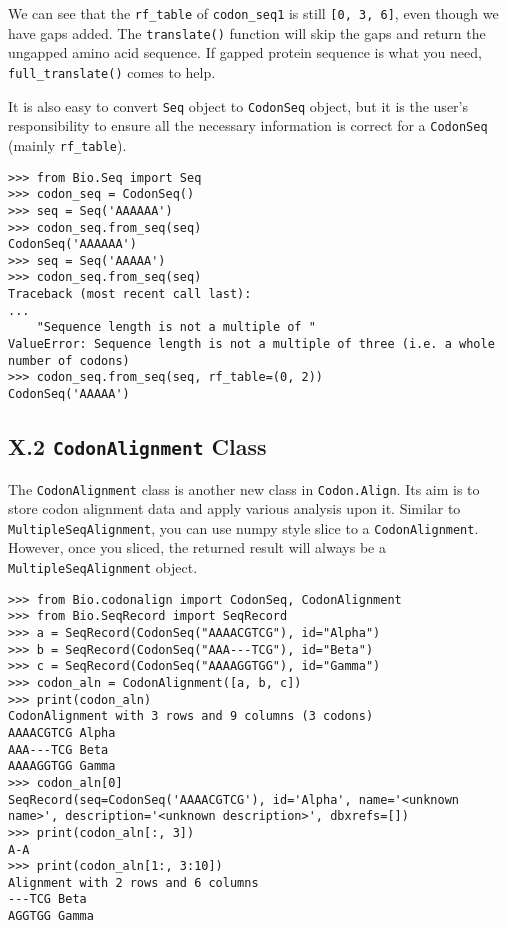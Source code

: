 \documentclass{article}
\begin{document}
We can see that the \texttt{rf\_table} of \texttt{codon\_seq1} is still
\texttt{{[}0, 3, 6{]}}, even though we have gaps added. The
\texttt{translate()} function will skip the gaps and return the ungapped
amino acid sequence. If gapped protein sequence is what you need,
\texttt{full\_translate()} comes to help.

It is also easy to convert \texttt{Seq} object to \texttt{CodonSeq}
object, but it is the user's responsibility to ensure all the necessary
information is correct for a \texttt{CodonSeq} (mainly
\texttt{rf\_table}).

\begin{verbatim}
>>> from Bio.Seq import Seq
>>> codon_seq = CodonSeq()
>>> seq = Seq('AAAAAA')
>>> codon_seq.from_seq(seq)
CodonSeq('AAAAAA')
>>> seq = Seq('AAAAA')
>>> codon_seq.from_seq(seq)
Traceback (most recent call last):
...
    "Sequence length is not a multiple of "
ValueError: Sequence length is not a multiple of three (i.e. a whole number of codons)
>>> codon_seq.from_seq(seq, rf_table=(0, 2))
CodonSeq('AAAAA')
\end{verbatim}

\subsection{X.2 \texttt{CodonAlignment} Class}

The \texttt{CodonAlignment} class is another new class in
\texttt{Codon.Align}. Its aim is to store codon alignment data and
apply various analysis upon it. Similar to
\texttt{MultipleSeqAlignment}, you can use numpy style slice to a
\texttt{CodonAlignment}. However, once you sliced, the returned result
will always be a \texttt{MultipleSeqAlignment} object.

\begin{verbatim}
>>> from Bio.codonalign import CodonSeq, CodonAlignment
>>> from Bio.SeqRecord import SeqRecord
>>> a = SeqRecord(CodonSeq("AAAACGTCG"), id="Alpha")
>>> b = SeqRecord(CodonSeq("AAA---TCG"), id="Beta")
>>> c = SeqRecord(CodonSeq("AAAAGGTGG"), id="Gamma")
>>> codon_aln = CodonAlignment([a, b, c])
>>> print(codon_aln)
CodonAlignment with 3 rows and 9 columns (3 codons)
AAAACGTCG Alpha
AAA---TCG Beta
AAAAGGTGG Gamma
>>> codon_aln[0]
SeqRecord(seq=CodonSeq('AAAACGTCG'), id='Alpha', name='<unknown name>', description='<unknown description>', dbxrefs=[])
>>> print(codon_aln[:, 3])
A-A
>>> print(codon_aln[1:, 3:10])
Alignment with 2 rows and 6 columns
---TCG Beta
AGGTGG Gamma
\end{verbatim}
\end{document}
